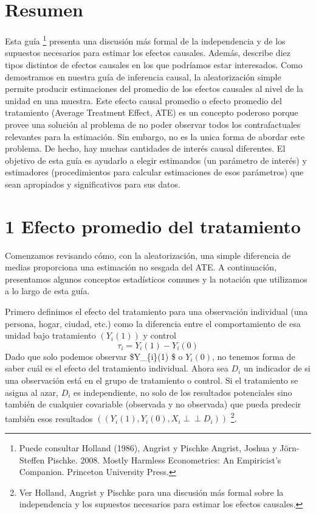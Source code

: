 \documentclass[
]{article}
\author{}
\date{\vspace{-2.5em}}
\begin{document}
{
\setcounter{tocdepth}{2}
\tableofcontents
}
\hypertarget{resumen}{%
\section{Resumen}\label{resumen}}

Esta guía \footnote{Puede consultar Holland (1986), Angrist y Pischke
  Angrist, Joshua y Jörn-Steffen Pischke. 2008. Mostly Harmless
  Econometrics: An Empiricist's Companion. Princeton University Press.}
presenta una discusión más formal de la independencia y de los supuestos
necesarios para estimar los efectos causales. Además, describe diez
tipos distintos de efectos causales en los que podríamos estar
interesados. Como demostramos en nuestra guía de inferencia causal, la
aleatorización simple permite producir estimaciones del promedio de los
efectos causales al nivel de la unidad en una muestra. Este efecto
causal promedio o efecto promedio del tratamiento (Average Treatment
Effect, ATE) es un concepto poderoso porque provee una solución al
problema de no poder observar todos los contrafactuales relevantes para
la estimación. Sin embargo, no es la unica forma de abordar este
problema. De hecho, hay muchas cantidades de interés causal diferentes.
El objetivo de esta guía es ayudarlo a elegir estimandos (un parámetro
de interés) y estimadores (procedimientos para calcular estimaciones de
esos parámetros) que sean apropiados y significativos para sus datos.

\hypertarget{efecto-promedio-del-tratamiento}{%
\section{1 Efecto promedio del
tratamiento}\label{efecto-promedio-del-tratamiento}}

Comenzamos revisando cómo, con la aleatorización, una simple diferencia
de medias proporciona una estimación no sesgada del ATE. A continuación,
presentamos algunos conceptos estadísticos comunes y la notación que
utilizamos a lo largo de esta guía.

Primero definimos el efecto del tratamiento para una observación
individual (una persona, hogar, ciudad, etc.) como la diferencia entre
el comportamiento de esa unidad bajo tratamiento \((Y_ {i} (1))\) y
control \[\tau_{i}=Y_{i}(1)-Y_{i}(0)\] Dado que solo podemos observar
\$Y\_\{i\}(1) \$ o \(Y_ {i} (0)\), no tenemos forma de saber cuál es el
efecto del tratamiento individual. Ahora sea \(D_{i}\) un indicador de
si una observación está en el grupo de tratamiento o control. Si el
tratamiento se asigna al azar, \(D_ {i}\) es independiente, no solo de
los resultados potenciales sino también de cualquier covariable
(observada y no observada) que pueda predecir también esos resultados
\(((Y_ {i} (1), Y_ {i } (0),X_ {i} \perp \perp D_ {i}))\) \footnote{Ver
  Holland, Angrist y Pischke para una discusión más formal sobre la
  independencia y los supuestos necesarios para estimar los efectos
  causales.}.
\end{document}
